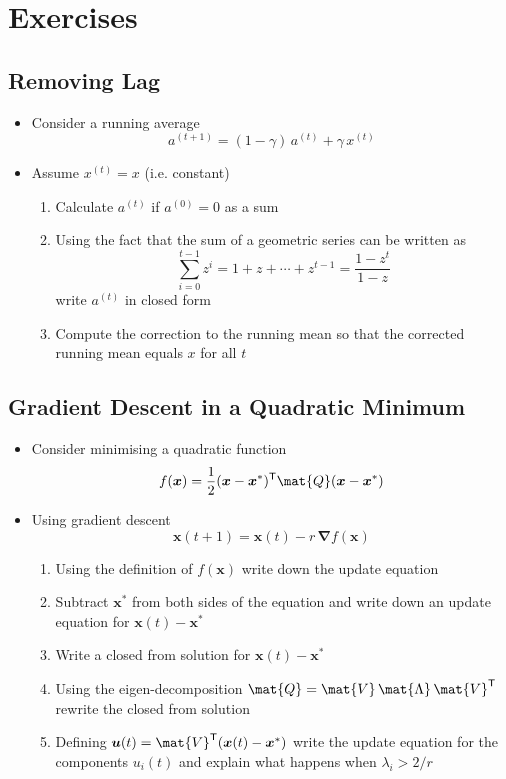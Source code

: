 \documentclass[11pt]{article}
\newcommand{\tr}{\textsf{T}}
\newcommand{\grad}{\bm{\nabla}}
\begin{document}
\section{Exercises}
\label{sec:orge5e87d6}

\subsection{Removing Lag}
\label{sec:org4d16968}
\begin{itemize}
\item Consider a running average
$$ a^{(t+1)} = (1-\gamma) \,a^{(t)} + \gamma \,x^{(t)} $$
\item Assume \(x^{(t)} = x\) (i.e. constant)
\begin{enumerate}
\item Calculate \(a^{(t)}\) if \(a^{(0)}=0\) as a sum
\item Using the fact that the sum of a geometric series can be written as
$$ \sum_{i=0}^{t-1} z^i = 1 + z+ \cdots + z^{t-1}= \frac{1-z^t}{1-z} $$
write \(a^{(t)}\) in closed form
\item Compute the correction to the running mean so that the
corrected running mean equals \(x\) for all \(t\)
\end{enumerate}
\end{itemize}

\subsection{Gradient Descent in a Quadratic Minimum}
\label{sec:org43bc72d}
\begin{itemize}
\item Consider minimising a quadratic function
$$ f(\bm{x}) = \frac{1}{2}(\bm{x}-\bm{x}^{*})^{\tr} \mat{Q} (\bm{x}-\bm{x}^{*}) $$
\item Using gradient descent
$$ \bm{x}(t+1) = \bm{x}(t) - r\, \grad f(\bm{x}) $$
\begin{enumerate}
\item Using the definition of \(f(\bm{x})\) write down the update
equation
\item Subtract \(\bm{x}^{*}\) from both sides of the equation and
write down an update equation for \(\bm{x}(t)-\bm{x}^{*}\)
\item Write a closed from solution for \(\bm{x}(t)-\bm{x}^{*}\)
\item Using the eigen-decomposition 
\(\mat{Q} = \mat{V}\,\mat{\Lambda}\,\mat{V}^{\tr}\)
rewrite the closed from solution
\item Defining \(\bm{u}(t) = \mat{V}^{\tr}(\bm{x}(t)-\bm{x}^{*})\) write the update
equation for the components \(u_{i}(t)\) and explain what
happens when \(\lambda_i > 2/r\)
\end{enumerate}
\end{itemize}
\end{document}
